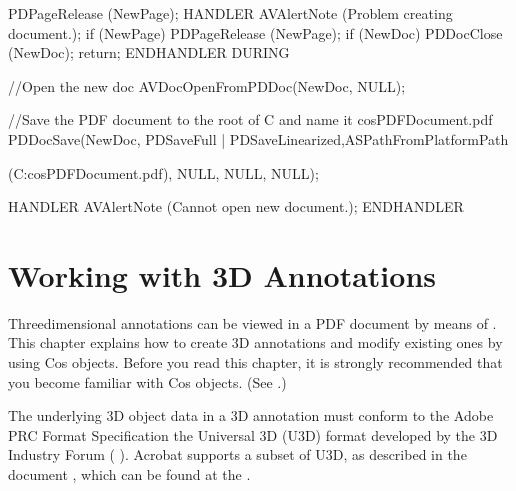 \documentclass[letterpaper,12pt,english,openany,oneside]{sphinxmanual}
\begin{document}
\begin{sphinxVerbatim}[commandchars=\\\{\}]
  PDPageRelease (NewPage);
\PYGZcb{}
HANDLER
  AVAlertNote (\PYGZdq{}Problem creating document.\PYGZdq{});
  if (NewPage) PDPageRelease (NewPage);
  if (NewDoc) PDDocClose (NewDoc);
  return;
END\PYGZus{}HANDLER
DURING


//Open the new doc
AVDocOpenFromPDDoc(NewDoc, NULL);


//Save the PDF document to the root of C and name it cosPDFDocument.pdf
PDDocSave(NewDoc, PDSaveFull | PDSaveLinearized,ASPathFromPlatformPath

(\PYGZdq{}C:cosPDFDocument.pdf\PYGZdq{}), NULL, NULL, NULL);

HANDLER
  AVAlertNote (\PYGZdq{}Cannot open new document.\PYGZdq{});
END\PYGZus{}HANDLER
\PYGZcb{}
\end{sphinxVerbatim}


\chapter{Working with 3D Annotations}
\label{\detokenize{Plugins_3D_samples:working-with-3d-annotations}}\label{\detokenize{Plugins_3D_samples::doc}}
Three\sphinxhyphen{}dimensional annotations can be viewed in a PDF document by means of . This chapter explains how to create 3D annotations and modify existing ones by using Cos objects. Before you read this chapter, it is strongly recommended that you become familiar with Cos objects. (See .)

The underlying 3D object data in a 3D annotation must conform to the Adobe PRC Format Specification the Universal 3D (U3D) format developed by the 3D Industry Forum (  ). Acrobat supports a subset of U3D, as described in the document , which can be found at the .
\end{document}
